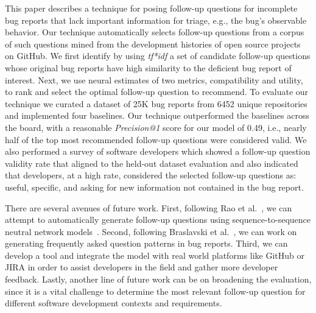 This paper describes a technique for posing follow-up questions for incomplete bug reports that lack important information for triage, e.g., the bug's observable behavior. Our technique automatically selects follow-up questions from a corpus of such questions mined from the development histories of open source projects on GitHub. We first identify by using {\em tf*idf} a set of candidate follow-up questions whose original bug reports have high similarity to the deficient bug report of interest. Next, we use neural estimates of two metrics, compatibility and utility, to rank and select the optimal follow-up question to recommend. To evaluate our technique we curated a dataset of 25K bug reports from 6452 unique repositories and implemented four baselines. Our technique outperformed the baselines across the board, with a reasonable {\em Precision@1} score for our model of 0.49, i.e., nearly half of the top most recommended follow-up questions were considered valid. We also performed a survey of software developers which showed a follow-up question validity rate that aligned to the held-out dataset evaluation and also indicated that developers, at a high rate, considered the selected follow-up questions as: useful, specific, and asking for new information not contained in the bug report.

There are several avenues of future work. First, following Rao et al.~\cite{rao2019answer}, we can attempt to automatically generate follow-up questions using sequence-to-sequence neutral network models~\cite{sutskever2014sequence, yin2015neural, serban2015building}. Second, following Braslavski et al.~\cite{10.1145/3020165.3022149}, we can work on generating frequently asked question patterns in bug reports. Third, we can develop a tool and integrate the \evpi model with real world platforms like GitHub or JIRA in order to assist developers in the field and gather more developer feedback. Lastly, another line of future work can be on broadening the evaluation, since it is a vital challenge to determine the most relevant follow-up question for different software development contexts and requirements.
